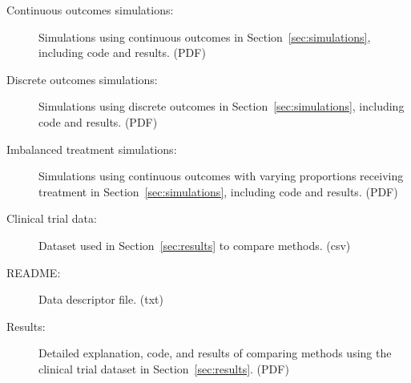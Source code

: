 \documentclass[12pt]{article}
\begin{document}
\begin{description}

\item[Continuous outcomes simulations:] Simulations using continuous outcomes in Section~\ref{sec:simulations}, including code and results. (PDF)
\item[Discrete outcomes simulations:] Simulations using discrete outcomes in Section~\ref{sec:simulations}, including code and results. (PDF)
\item[Imbalanced treatment simulations:] Simulations using continuous outcomes with varying proportions receiving treatment in Section~\ref{sec:simulations}, including code and results. (PDF)
\item[Clinical trial data:] Dataset used in Section~\ref{sec:results} to compare methods. (csv)
\item[README:] Data descriptor file. (txt)
\item[Results:] Detailed explanation, code, and results of comparing methods using the clinical trial dataset in Section~\ref{sec:results}. (PDF)

\end{description}




\end{document}
